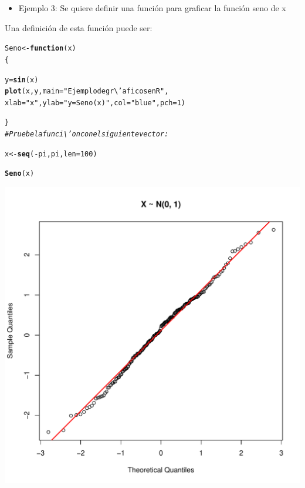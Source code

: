 \documentclass[12pt,letterpaper]{article}\usepackage[]{graphicx}\usepackage[]{color}
\makeatletter
\def\maxwidth{ %
  \ifdim\Gin@nat@width>\linewidth
    \linewidth
  \else
    \Gin@nat@width
  \fi
}
\newcommand{\hlnum}[1]{\textcolor[rgb]{0.686,0.059,0.569}{#1}}%
\newcommand{\hlstr}[1]{\textcolor[rgb]{0.192,0.494,0.8}{#1}}%
\newcommand{\hlcom}[1]{\textcolor[rgb]{0.678,0.584,0.686}{\textit{#1}}}%
\newcommand{\hlopt}[1]{\textcolor[rgb]{0,0,0}{#1}}%
\newcommand{\hlstd}[1]{\textcolor[rgb]{0.345,0.345,0.345}{#1}}%
\newcommand{\hlkwa}[1]{\textcolor[rgb]{0.161,0.373,0.58}{\textbf{#1}}}%
\newcommand{\hlkwb}[1]{\textcolor[rgb]{0.69,0.353,0.396}{#1}}%
\newcommand{\hlkwc}[1]{\textcolor[rgb]{0.333,0.667,0.333}{#1}}%
\newcommand{\hlkwd}[1]{\textcolor[rgb]{0.737,0.353,0.396}{\textbf{#1}}}%
\newenvironment{kframe}{%
 \def\at@end@of@kframe{}%
 \ifinner\ifhmode%
  \def\at@end@of@kframe{\end{minipage}}%
  \begin{minipage}{\columnwidth}%
 \fi\fi%
 \def\FrameCommand##1{\hskip\@totalleftmargin \hskip-\fboxsep
 \colorbox{shadecolor}{##1}\hskip-\fboxsep
     \hskip-\linewidth \hskip-\@totalleftmargin \hskip\columnwidth}%
 \MakeFramed {\advance\hsize-\width
   \@totalleftmargin\z@ \linewidth\hsize
   \@setminipage}}%
 {\par\unskip\endMakeFramed%
 \at@end@of@kframe}
\newenvironment{knitrout}{}{} %
\makeatother
\begin{document}
\begin{itemize}
\item Ejemplo 3: Se quiere definir una funci\'on para graficar la funci\'on seno de x
\end {itemize}
Una definici\'on de esta funci\'on puede ser:
\begin{knitrout}
\color{fgcolor}\begin{kframe}
\begin{alltt}
\hlstd{Seno} \hlkwb{<-} \hlkwa{function}\hlstd{(}\hlkwc{x}\hlstd{)}
\hlstd{\{}

  \hlstd{y} \hlkwb{=} \hlkwd{sin}\hlstd{(x)}
\hlkwd{plot}\hlstd{(x, y,} \hlkwc{main}\hlstd{=}\hlstr{"Ejemplo de gr\textbackslash{}'aficos en R"}\hlstd{,}
\hlkwc{xlab}\hlstd{=}\hlstr{"x"}\hlstd{,} \hlkwc{ylab}\hlstd{=}\hlstr{"y = Seno(x)"}\hlstd{,} \hlkwc{col}\hlstd{=}\hlstr{"blue"}\hlstd{,} \hlkwc{pch}\hlstd{=}\hlnum{1}\hlstd{)}

\hlstd{\}}
\hlcom{# Pruebe la funci\textbackslash{}'on con el siguiente vector:}

\hlstd{x}\hlkwb{<-}\hlkwd{seq}\hlstd{(}\hlopt{-}\hlstd{pi, pi,} \hlkwc{len}\hlstd{=}\hlnum{100}\hlstd{)}

\hlkwd{Seno}\hlstd{(x)}
\end{alltt}
\end{kframe}
\includegraphics[width=\maxwidth]{figure/unnamed-chunk-5-1} 

\end{knitrout}
\newpage
\end{document}
